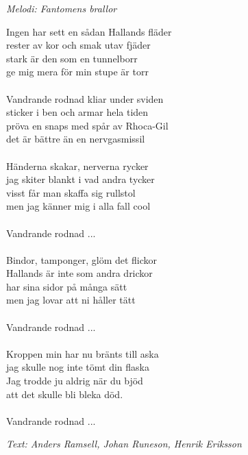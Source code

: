 {\footnotesize\textit{Melodi: Fantomens brallor}}\par
\vspace{10pt}
Ingen har sett en sådan Hallands fläder\\
rester av kor och smak utav fjäder\\
stark är den som en tunnelborr\\
ge mig mera för min stupe är torr\\
\\
Vandrande rodnad kliar under sviden\\
sticker i ben och armar hela tiden\\
pröva en snaps med spår av Rhoca-Gil\\
det är bättre än en nervgasmissil\\
\\
Händerna skakar, nerverna rycker\\
jag skiter blankt i vad andra tycker\\
visst får man skaffa sig rullstol\\
men jag känner mig i alla fall cool\\
\\
Vandrande rodnad ...\\
\\
Bindor, tamponger, glöm det flickor\\
Hallands är inte som andra drickor\\
har sina sidor på många sätt\\
men jag lovar att ni håller tätt\\
\\
Vandrande rodnad ...\\
\\
Kroppen min har nu bränts till aska\\
jag skulle nog inte tömt din flaska\\
Jag trodde ju aldrig när du bjöd \\
att det skulle bli bleka död.\\
\\
Vandrande rodnad ...\par
\vspace{10pt}
{\footnotesize\textit{Text: Anders Ramsell, Johan Runeson, Henrik Eriksson}}
